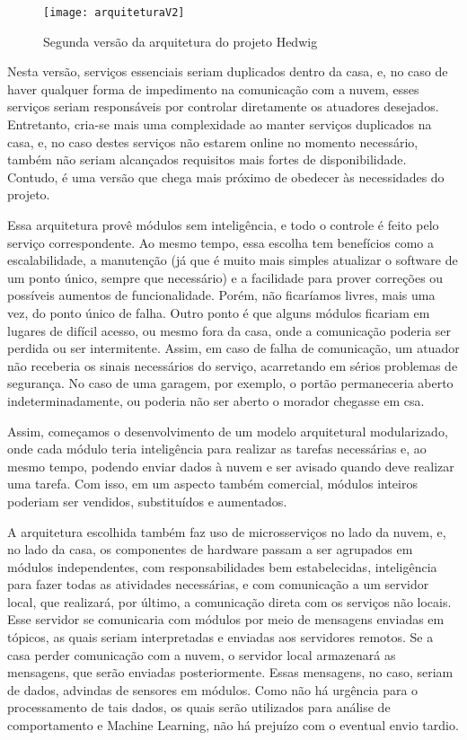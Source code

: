 \begin{figure}[H]
	\centering
	\caption{Segunda versão da arquitetura do projeto Hedwig}
  \texttt{[image: arquiteturaV2]}
\label{fig:arquiteturaV2}
\end{figure}

Nesta versão, serviços essenciais seriam duplicados dentro da casa, e, no caso de haver qualquer forma de impedimento na comunicação com a nuvem, esses serviços seriam responsáveis por controlar diretamente os atuadores desejados. Entretanto, cria-se mais uma complexidade ao manter serviços duplicados na casa, e, no caso destes serviços não estarem online no momento necessário, também não seriam alcançados requisitos mais fortes de disponibilidade. Contudo, é uma versão que chega mais próximo de obedecer às necessidades do projeto.

Essa arquitetura provê módulos sem inteligência, e todo o controle é feito pelo serviço correspondente. Ao mesmo tempo, essa escolha tem benefícios como a escalabilidade, a manutenção (já que é muito mais simples atualizar o software de um ponto único, sempre que necessário) e a facilidade para prover correções ou possíveis aumentos de funcionalidade. Porém, não ficaríamos livres, mais uma vez, do ponto único de falha. Outro ponto é que alguns módulos ficariam em lugares de difícil acesso, ou mesmo fora da casa, onde a comunicação poderia ser perdida ou ser intermitente. Assim, em caso de falha de comunicação, um atuador não receberia os sinais necessários do serviço, acarretando em sérios problemas de segurança. No caso de uma garagem, por exemplo, o portão permaneceria aberto indeterminadamente, ou poderia não ser aberto o morador chegasse em csa.

Assim, começamos o desenvolvimento de um modelo arquitetural modularizado, onde cada módulo teria inteligência para realizar as tarefas necessárias e, ao mesmo tempo, podendo enviar dados à nuvem e ser avisado quando deve realizar uma tarefa. Com isso, em um aspecto também comercial, módulos inteiros poderiam ser vendidos, substituídos e aumentados.

A arquitetura escolhida também faz uso de microsserviços no lado da nuvem, e, no lado da casa, os componentes de hardware passam a ser agrupados em módulos independentes, com responsabilidades bem estabelecidas, inteligência para fazer todas as atividades necessárias, e com comunicação a um servidor local, que realizará, por último, a comunicação direta com os serviços não locais. Esse servidor se comunicaria com módulos por meio de mensagens enviadas em tópicos, as quais seriam interpretadas e enviadas aos servidores remotos. Se a casa perder comunicação com a nuvem, o servidor local armazenará as mensagens, que serão enviadas posteriormente. Essas mensagens, no caso, seriam de dados, advindas de sensores em módulos. Como não há urgência para o processamento de tais dados, os quais serão utilizados para análise de comportamento e Machine Learning, não há prejuízo com o eventual envio tardio.

